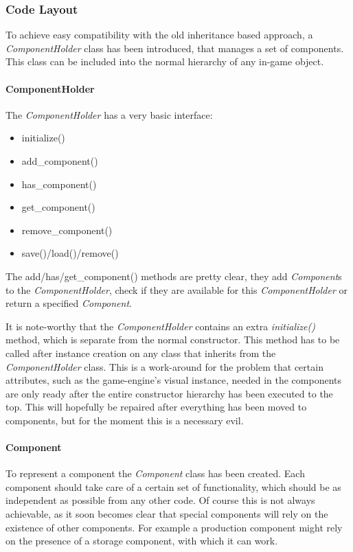 \subsubsection{Code Layout}
To achieve easy compatibility with the old inheritance based approach, a \textit{ComponentHolder} class has been
introduced, that manages a set of components. This class can be included into the normal hierarchy of any in-game object.

\paragraph{ComponentHolder}
The \textit{ComponentHolder} has a very basic interface:
\begin{itemize}
    \item initialize()
    \item add\_component()
    \item has\_component()
    \item get\_component()
    \item remove\_component()
    \item save()/load()/remove()
\end{itemize}
The add/has/get\_component() methods are pretty clear, they add \textit{Component}s to the \textit{ComponentHolder}, check if
they are available for this \textit{ComponentHolder} or return a specified \textit{Component}.

It is note-worthy that the \textit{ComponentHolder} contains an extra \textit{initialize()} method, which is separate from the
normal constructor. This method has to be called after instance creation on any class that inherits from the
\textit{ComponentHolder} class. This is a work-around for the problem that certain attributes, such as the game-engine's
visual instance, needed in the components are only ready after the entire constructor hierarchy has been executed to the
top. This will hopefully be repaired after everything has been moved to components, but for the moment this is a
necessary evil.

\paragraph{Component}
To represent a component the \textit{Component} class has been created. Each component should take care of a certain set
of functionality, which should be as independent as possible from any other code. Of course this is not always
achievable, as it soon becomes clear that special components will rely on the existence of other components. For example
a production component might rely on the presence of a storage component, with which it can work.

